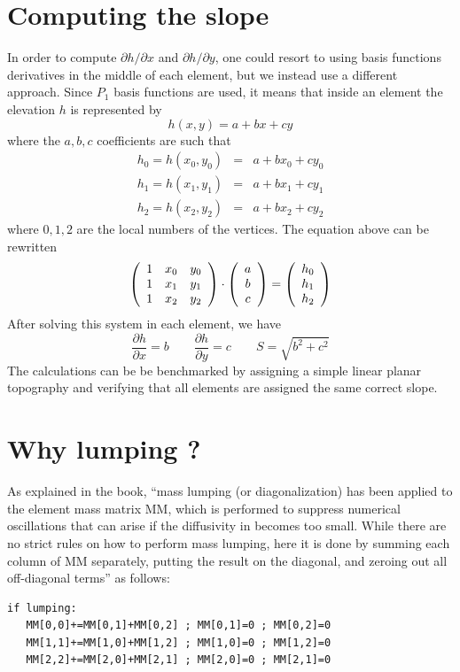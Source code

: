 \section*{Computing the slope}

In order to compute $\partial h/\partial x$ and $\partial h/\partial y$, one could resort to using 
basis functions derivatives in the middle of each element, but we
instead use a different approach. 
Since $P_1$ basis functions are used, it means that inside an element 
the elevation $h$ is represented by 
\[
h(x,y)=a+bx+cy
\]
where the $a,b,c$ coefficients are such that 
\begin{eqnarray}
h_0=h(x_0,y_0) &=& a + bx_0 + cy_0 \\
h_1=h(x_1,y_1) &=& a + bx_1 + cy_1 \\
h_2=h(x_2,y_2) &=& a + bx_2 + cy_2
\end{eqnarray} 
where $0,1,2$ are the local numbers of the vertices.
The equation above can be rewritten
\[
\left(
\begin{array}{ccc}
1 & x_0 & y_0 \nonumber\\
1 & x_1 & y_1 \nonumber\\
1 & x_2 & y_2 \\
\end{array}
\right)
\cdot
\left(
\begin{array}{c}
a \\ b \\ c
\end{array}
\right)
=
\left(
\begin{array}{c}
h_0 \\ h_1 \\ h_2
\end{array}
\right)
\]
After solving this system in each element, we have
\[
\frac{\partial h}{\partial x} = b 
\qquad
\frac{\partial h}{\partial y} = c
\qquad
S=\sqrt{b^2+c^2}
\]
The calculations can be be benchmarked by assigning a simple linear planar 
topography and verifying that all elements are assigned the same correct slope.

\section*{Why lumping ?}

As explained in the book, ``mass lumping (or diagonalization) has been applied to the element mass matrix MM, which
is performed to suppress numerical oscillations that can arise if the diffusivity in becomes too
small. While there are no strict rules on how to perform mass lumping, here it is done by summing
each column of MM separately, putting the result on the diagonal, and zeroing out all off-diagonal
terms'' as follows:
\begin{lstlisting}
if lumping:
   MM[0,0]+=MM[0,1]+MM[0,2] ; MM[0,1]=0 ; MM[0,2]=0
   MM[1,1]+=MM[1,0]+MM[1,2] ; MM[1,0]=0 ; MM[1,2]=0
   MM[2,2]+=MM[2,0]+MM[2,1] ; MM[2,0]=0 ; MM[2,1]=0
\end{lstlisting}




